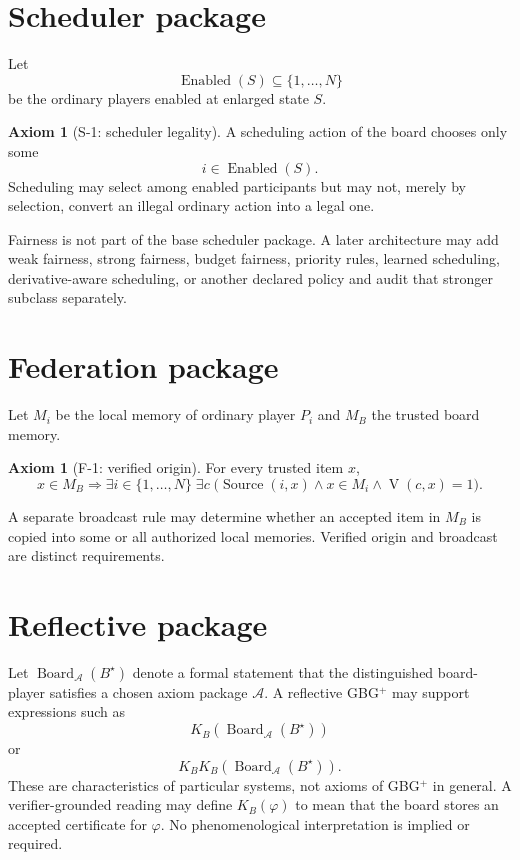 \documentclass[11pt]{article}
\theoremstyle{definition}
\newtheorem{axiom}[theorem]{Axiom}
\theoremstyle{remark}
\newcommand{\Board}{B^{\star}}
\newcommand{\V}{\operatorname{V}}
\newcommand{\Source}{\operatorname{Source}}
\begin{document}
\section{Scheduler package}

Let
\[
\operatorname{Enabled}(S)\subseteq\{1,\ldots,N\}
\]
be the ordinary players enabled at enlarged state $S$.

\begin{axiom}[S-1: scheduler legality]
A scheduling action of the board chooses only some
\[
i\in\operatorname{Enabled}(S).
\]
Scheduling may select among enabled participants but may not, merely by selection, convert an illegal ordinary action into a legal one.
\end{axiom}

Fairness is not part of the base scheduler package.  A later architecture may add weak fairness, strong fairness, budget fairness, priority rules, learned scheduling, derivative-aware scheduling, or another declared policy and audit that stronger subclass separately.

\section{Federation package}

Let $M_i$ be the local memory of ordinary player $P_i$ and $M_B$ the trusted board memory.

\begin{axiom}[F-1: verified origin]
For every trusted item $x$,
\[
\boxed{
x\in M_B
\Longrightarrow
\exists i\in\{1,\ldots,N\}\;\exists c\;
\bigl(\Source(i,x)\land x\in M_i\land\V(c,x)=1\bigr).
}
\]
\end{axiom}

A separate broadcast rule may determine whether an accepted item in $M_B$ is copied into some or all authorized local memories.  Verified origin and broadcast are distinct requirements.

\section{Reflective package}

Let $\operatorname{Board}_{\mathcal A}(\Board)$ denote a formal statement that the distinguished board-player satisfies a chosen axiom package $\mathcal A$.  A reflective GBG$^{+}$ may support expressions such as
\[
K_B(\operatorname{Board}_{\mathcal A}(\Board))
\]
or
\[
K_BK_B(\operatorname{Board}_{\mathcal A}(\Board)).
\]
These are characteristics of particular systems, not axioms of GBG$^{+}$ in general.  A verifier-grounded reading may define $K_B(\varphi)$ to mean that the board stores an accepted certificate for $\varphi$.  No phenomenological interpretation is implied or required.
\end{document}
